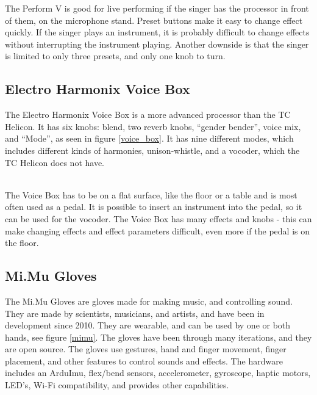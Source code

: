 The Perform V is good for live performing if the singer has the processor in front of them, on the microphone stand. Preset buttons make it easy to change effect quickly. 
If the singer plays an instrument, it is probably difficult to change effects without interrupting the instrument playing. Another downside is that the singer is limited to only three presets, and only one knob to turn.

\subsection{Electro Harmonix Voice Box}

The Electro Harmonix Voice Box is a more advanced processor than the TC Helicon\citep{VoiceBox}. It has six knobs: blend, two reverb knobs, “gender bender”, voice mix, and “Mode”, as seen in figure \ref{voice_box}. It has nine different modes, which includes different kinds of harmonies, unison-whistle, and a vocoder, which the TC Helicon does not have.\\

\begin{minipage}{\linewidth}%
\label{voice_box}
\end{minipage}\\

The Voice Box has to be on a flat surface, like the floor or a table and is most often used as a pedal. It is possible to insert an instrument into the pedal, so it can be used for the vocoder. The Voice Box has many effects and knobs - this can make changing effects and effect parameters difficult, even more if the pedal is on the floor.

\subsection{Mi.Mu Gloves}

The Mi.Mu Gloves are gloves made for making music, and controlling sound\citep{Mimu}. They are made by scientists, musicians, and artists, and have been in development since 2010. They are wearable, and can be used by one or both hands, see figure \ref{mimu}. The gloves have been through many iterations, and they are open source. The gloves use gestures, hand and finger movement, finger placement, and other features to control sounds and effects. The hardware includes an ArduImu, flex/bend sensors, accelerometer, gyroscope, haptic motors, LED's, Wi-Fi compatibility, and provides other capabilities.\\

